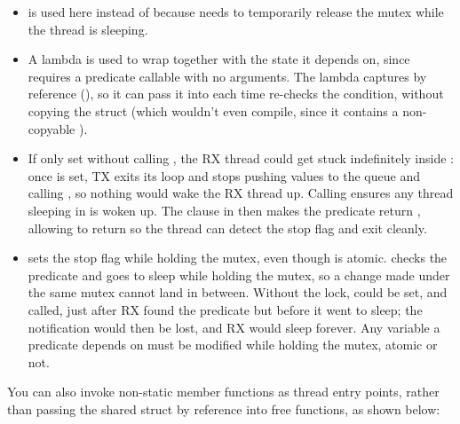 \note[Notes]
\begin{itemize}
  \item {} is used here instead of  because
     needs to temporarily release the mutex while the thread is sleeping.
  \item A lambda is used to wrap  together with the  state it
    depends on, since  requires a predicate callable with no arguments. The
    lambda captures  by reference (\code{[&shared]}), so it can pass it into
     each time  re-checks the condition, without copying
    the  struct (which wouldn't even compile, since it contains a non-copyable
    ).
  \item If  only set  without calling , the RX
    thread could get stuck indefinitely inside : once  is set, TX
    exits its loop and stops pushing values to the queue and calling , so
    nothing would wake the RX thread up. Calling  ensures any thread sleeping in
     is woken up. The  clause in 
    then makes the predicate return , allowing  to return so the thread can
    detect the stop flag and exit cleanly.
  \item {} sets the stop flag while holding the mutex, even though  is
    atomic.  checks the predicate and goes to sleep while holding the mutex, so a
    change made under the same mutex cannot land in between. Without the lock,  could be
    set, and  called, just after RX found the predicate  but before
    it went to sleep; the notification would then be lost, and RX would sleep forever. Any variable
    a predicate depends on must be modified while holding the mutex, atomic or not.
\end{itemize}

You can also invoke non-static member functions as thread entry points, rather than passing the
shared struct by reference into free functions, as shown below:

